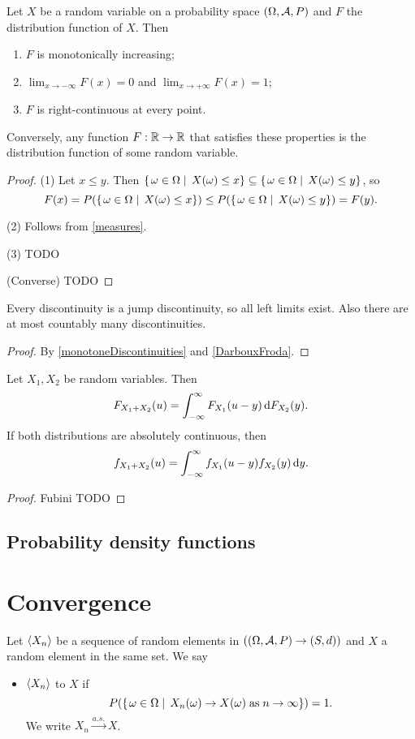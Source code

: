 \begin{proposition}
Let $X$ be a random variable on a probability space $\left( \Omega, \mathcal{A}, P \right)$ and $F$ the distribution function of $X$. Then
\begin{enumerate}
\item $F$ is monotonically increasing;
\item $\lim_{x\to-\infty} F(x) = 0$ and $\lim_{x\to+\infty} F(x) = 1$; 
\item $F$ is right-continuous at every point.
\end{enumerate}
Conversely, any function $F:\mathbb{R}\to\mathbb{R}$ that satisfies these properties is the distribution function of some random variable.
\end{proposition}
\begin{proof}
(1) Let $x\leq y$. Then $\left\{\left. \omega\in \Omega \;\right|\; X(\omega) \leq x \right\} \subseteq \left\{\left. \omega\in \Omega \;\right|\; X(\omega) \leq y \right\}$, so
\[ F(x) =  P(\left\{\left. \omega\in \Omega \;\right|\; X(\omega) \leq x \right\}) \leq  P(\left\{\left. \omega\in \Omega \;\right|\; X(\omega) \leq y \right\}) = F(y). \]

(2) Follows from \ref{measures}.

(3) TODO

(Converse) TODO
\end{proof}
\begin{corollary}
Every discontinuity is a jump discontinuity, so all left limits exist. Also there are at most countably many discontinuities.
\end{corollary}
\begin{proof}
By \ref{monotoneDiscontinuities} and \ref{DarbouxFroda}.
\end{proof}

\begin{proposition}
Let $X_1, X_2$ be random variables. Then
\[ F_{X_1+X_2}(u) = \int_{-\infty}^\infty F_{X_1}(u-y)\operatorname{d \!}{F_{X_2}(y)}. \]
If both distributions are absolutely continuous, then
\[ f_{X_1+X_2}(u) = \int_{-\infty}^\infty f_{X_1}(u-y)f_{X_2}(y)\operatorname{d \!}{y}. \]
\end{proposition}
\begin{proof}
Fubini TODO
\end{proof}

\subsection{Probability density functions}

\section{Convergence}
\begin{definition}
Let $\langle X_n \rangle$ be a sequence of random elements in $(\left( \Omega, \mathcal{A}, P \right) \to \left( S,d \right))$ and $X$ a random element in the same set. We say
\begin{itemize}
\item $\langle X_n \rangle$  to $X$ if
\[ P(\left\{\left. \omega\in\Omega \;\right|\; X_n(\omega) \to X(\omega)\;\text{as}\; n\to \infty \right\}) = 1. \]
We write $X_n \overset{a.s.}{\longrightarrow} X$.
\end{itemize}
\end{definition}

